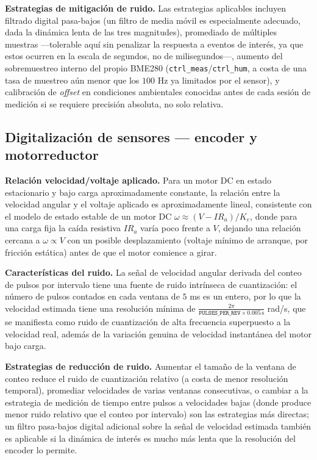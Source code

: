 \textbf{Estrategias de mitigación de ruido.} Las estrategias aplicables incluyen filtrado digital pasa-bajos (un filtro de media móvil es especialmente adecuado, dada la dinámica lenta de las tres magnitudes), promediado de múltiples muestras —tolerable aquí sin penalizar la respuesta a eventos de interés, ya que estos ocurren en la escala de segundos, no de milisegundos—, aumento del sobremuestreo interno del propio BME280 (\texttt{ctrl\_meas}/\texttt{ctrl\_hum}, a costa de una tasa de muestreo aún menor que los $100$ Hz ya limitados por el sensor), y calibración de \emph{offset} en condiciones ambientales conocidas antes de cada sesión de medición si se requiere precisión absoluta, no solo relativa.

\subsection{Digitalización de sensores — encoder y motorreductor}

\textbf{Relación velocidad/voltaje aplicado.} Para un motor DC en estado estacionario y bajo carga aproximadamente constante, la relación entre la velocidad angular y el voltaje aplicado es aproximadamente lineal, consistente con el modelo de estado estable de un motor DC $\omega \approx (V - I R_a)/K_e$, donde para una carga fija la caída resistiva $I R_a$ varía poco frente a $V$, dejando una relación cercana a $\omega \propto V$ con un posible desplazamiento (voltaje mínimo de arranque, por fricción estática) antes de que el motor comience a girar.

\textbf{Características del ruido.} La señal de velocidad angular derivada del conteo de pulsos por intervalo tiene una fuente de ruido intrínseca de cuantización: el número de pulsos contados en cada ventana de $5$ ms es un entero, por lo que la velocidad estimada tiene una resolución mínima de $\frac{2\pi}{\texttt{PULSES\_PER\_REV} \times 0.005\,\text{s}}$ rad/s, que se manifiesta como ruido de cuantización de alta frecuencia superpuesto a la velocidad real, además de la variación genuina de velocidad instantánea del motor bajo carga.

\textbf{Estrategias de reducción de ruido.} Aumentar el tamaño de la ventana de conteo reduce el ruido de cuantización relativo (a costa de menor resolución temporal), promediar velocidades de varias ventanas consecutivas, o cambiar a la estrategia de medición de tiempo entre pulsos a velocidades bajas (donde produce menor ruido relativo que el conteo por intervalo) son las estrategias más directas; un filtro pasa-bajos digital adicional sobre la señal de velocidad estimada también es aplicable si la dinámica de interés es mucho más lenta que la resolución del encoder lo permite.

